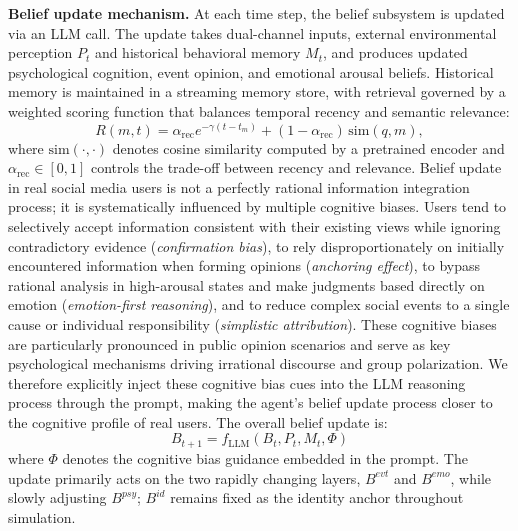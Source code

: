 \documentclass[a4paper,fleqn]{cas-dc}
\begin{document}
\textbf{Belief update mechanism.} At each time step, the belief subsystem is updated via an LLM call. The update takes dual-channel inputs, external environmental perception $P_t$ and historical behavioral memory $M_t$, and produces updated psychological cognition, event opinion, and emotional arousal beliefs. Historical memory is maintained in a streaming memory store, with retrieval governed by a weighted scoring function that balances temporal recency and semantic relevance:
\begin{equation}
R(m, t) = \alpha_{\mathrm{rec}} e^{-\gamma(t - t_m)} + (1-\alpha_{\mathrm{rec}})\,\text{sim}(q, m),
\label{eq:mmr}
\end{equation}
where $\text{sim}(\cdot,\cdot)$ denotes cosine similarity computed by a pretrained encoder and $\alpha_{\mathrm{rec}}\in[0,1]$ controls the trade-off between recency and relevance. Belief update in real social media users is not a perfectly rational information integration process; it is systematically influenced by multiple cognitive biases. Users tend to selectively accept information consistent with their existing views while ignoring contradictory evidence (\textit{confirmation bias}), to rely disproportionately on initially encountered information when forming opinions (\textit{anchoring effect}), to bypass rational analysis in high-arousal states and make judgments based directly on emotion (\textit{emotion-first reasoning}), and to reduce complex social events to a single cause or individual responsibility (\textit{simplistic attribution}). These cognitive biases are particularly pronounced in public opinion scenarios and serve as key psychological mechanisms driving irrational discourse and group polarization. We therefore explicitly inject these cognitive bias cues into the LLM reasoning process through the prompt, making the agent's belief update process closer to the cognitive profile of real users. The overall belief update is:
\begin{equation}
B_{t+1} = f_{\text{LLM}}(B_t, P_t, M_t, \Phi)
\label{eq:belief_update}
\end{equation}
where $\Phi$ denotes the cognitive bias guidance embedded in the prompt. The update primarily acts on the two rapidly changing layers, $B^{evt}$ and $B^{emo}$, while slowly adjusting $B^{psy}$; $B^{id}$ remains fixed as the identity anchor throughout simulation.
\end{document}
